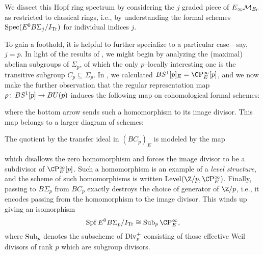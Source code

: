 We dissect this Hopf ring spectrum by considering the \(j\){\th} graded piece of \(E_\infty\mathcal{M}_{E_\Gamma}\) as restricted to classical rings, i.e., by understanding the formal schemes \(\operatorname{Spec} (E^0 B\Sigma_j / I_{\mathrm{Tr}})\) for individual indices \(j\).

\begin{example}
To gain a foothold, it is helpful to further specialize to a particular case---say, \(j = p\).  In light of the results of , we might begin by analyzing the (maximal) abelian subgroups of \(\Sigma_p\), of which the only \(p\)--locally interesting one is the transitive subgroup \(C_p \subseteq \Sigma_p\).  In , we calculated \(BS^1[p]_E = \CP^\infty_E[p]\), and we now make the further observation that the regular representation map \(\rho\colon\thinspace BS^1[p] \to BU(p)\) induces the following map on cohomological formal schemes:
\begin{center}
\end{center}
where the bottom arrow sends such a homomorphism to its image divisor.  This map belongs to a larger diagram of schemes:
\begin{center}
\end{center}
The quotient by the transfer ideal in \((BC_p)_E\) is modeled by the map
\begin{center}
\end{center}
which disallows the zero homomorphism and forces the image divisor to be a subdivisor of \(\CP^\infty_E[p]\).  Such a homomorphism is an example of a \textit{level structure}, and the scheme of such homomorphisms is written \(\Level(\Z/p, \CP^\infty_E)\).  Finally, passing to \(B\Sigma_p\) from \(BC_p\) exactly destroys the choice of generator of \(\Z/p\), i.e., it encodes passing from the homomorphism to the image divisor.  This winds up giving an isomorphism \[\Spf E^0 B\Sigma_p / I_{\Tr} \cong \Sub_p \CP^\infty_E,\] where \(\operatorname{Sub}_p\) denotes the subscheme of \(\operatorname{Div}_p^+\) consisting of those effective Weil divisors of rank \(p\) which are subgroup divisors.
\end{example}

